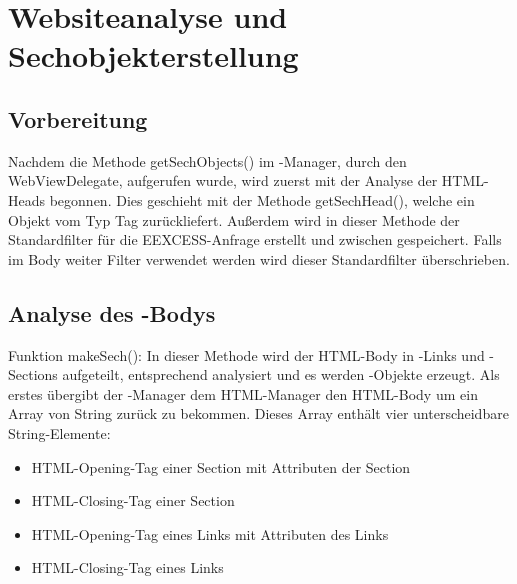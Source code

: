 \chapter{Websiteanalyse und Sechobjekterstellung}

\section{Vorbereitung}

Nachdem die Methode getSechObjects() im \SECH-Manager, durch den WebViewDelegate, aufgerufen wurde, wird zuerst mit der Analyse der HTML-Heads begonnen. Dies geschieht mit der Methode getSechHead(), welche ein Objekt vom Typ Tag zurückliefert. Außerdem wird in dieser Methode der Standardfilter für die EEXCESS-Anfrage erstellt und zwischen gespeichert. Falls im Body weiter Filter verwendet werden wird dieser Standardfilter überschrieben.

\section{Analyse des \SEARCH-Bodys}

Funktion makeSech(): In dieser Methode wird der HTML-Body in \SEARCH-Links und \SEARCH-Sections aufgeteilt, entsprechend analysiert und es werden \SECH-Objekte erzeugt.
Als erstes übergibt der \SECH-Manager dem HTML-Manager den HTML-Body um ein Array von String zurück zu bekommen. Dieses Array enthält vier unterscheidbare String-Elemente:
\begin{itemize}
	\item HTML-Opening-Tag einer Section mit Attributen der Section
	\item HTML-Closing-Tag einer Section
	\item HTML-Opening-Tag eines Links mit Attributen des Links
	\item HTML-Closing-Tag eines Links
\end{itemize}

